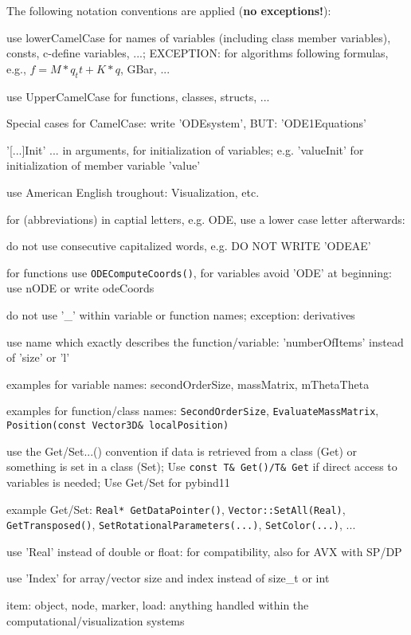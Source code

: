 %
The following notation conventions are applied ({\bf no exceptions!}):
\bi
		\item use lowerCamelCase for names of variables (including class member variables), consts, c-define variables, ...; EXCEPTION: for algorithms following formulas, e.g., $f = M*q_tt + K*q$, GBar, ...
		\item use UpperCamelCase for functions, classes, structs, ...
		\item Special cases for CamelCase: write 'ODEsystem', BUT: 'ODE1Equations'
		\item '[...]Init' ... in arguments, for initialization of variables; e.g. 'valueInit' for initialization of member variable 'value'
		\item use American English troughout: Visualization, etc.
		\item for (abbreviations) in captial letters, e.g. ODE, use a lower case letter afterwards:
		\item do not use consecutive capitalized words, e.g. DO NOT WRITE 'ODEAE'
		\item for functions use \texttt{ODEComputeCoords()}, for variables avoid 'ODE' at beginning: use nODE or write odeCoords
		\item do not use '\_' within variable or function names; exception: derivatives
		\item use name which exactly describes the function/variable: 'numberOfItems' instead of 'size' or 'l'
		\item examples for variable names: secondOrderSize, massMatrix, mThetaTheta
		\item examples for function/class names: \texttt{SecondOrderSize}, \texttt{EvaluateMassMatrix}, \texttt{Position(const Vector3D\& localPosition)}
		\item use the Get/Set...() convention if data is retrieved from a class (Get) or something is set in a class (Set); Use \texttt{const T\& Get()/T\& Get} if direct access to variables is needed; Use Get/Set for pybind11
		\item example Get/Set: \texttt{Real* GetDataPointer()}, \texttt{Vector::SetAll(Real)}, \texttt{GetTransposed()}, \texttt{SetRotationalParameters(...)}, \texttt{SetColor(...)}, ...
		\item use 'Real' instead of double or float: for compatibility, also for AVX with SP/DP
		\item use 'Index' for array/vector size and index instead of size\_t or int
		\item item: object, node, marker, load: anything handled within the computational/visualization systems
\ei

